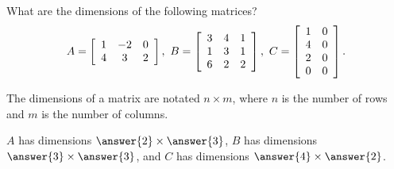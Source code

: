 \documentclass{ximera}
\author{Zack Reed}
\begin{document}
\begin{exercise}
  What are the dimensions of the following matrices?
  \begin{equation*}
    A = \startmat{ccc}
      1 & -2 & 0 \\
      4 & 3 & 2
    \stopmat,
    \quad
    B = \startmat{ccc}
      3 & 4 & 1 \\
      1 & 3 & 1 \\
      6 & 2 & 2
    \stopmat,
    \quad
    C = \startmat{cc}
      1 & 0 \\
      4 & 0 \\
      2 & 0 \\
      0 & 0
    \stopmat.
  \end{equation*}

  \begin{hint}
      The dimensions of a matrix are notated $n \times m$, where $n$ is the number of rows and $m$ is the number of columns.
  \end{hint}
  
  $A$ has dimensions $\answer{2}\times \answer{3}$, $B$ has dimensions $\answer{3}\times \answer{3}$, and $C$ has dimensions $\answer{4}\times \answer{2}$.
  
\end{exercise}
\end{document}
